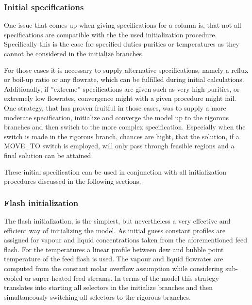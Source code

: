    \subsubsection{Initial specifications}
        One issue that comes up when giving specifications for a column is, that not all specifications
        are compatible with the the used initialization procedure. Specifically this is the case for
        specified duties purities or temperatures as they cannot be considered in the initialize branches.

        For those cases it is necessary to supply alternative specifications, namely a reflux or boil-up ratio
        or any flowrate, which can be fulfilled during initial calculations. Additionally, if ''extreme''
        specifications are given such as very high purities, or extremely low flowrates, convergence might
        with a given procedure might fail. One strategy, that has proven fruitful in those cases, was to
        supply a more moderate specification, initialize and converge the model up to the rigorous
        branches and then switch to the more complex specification. Especially when the switch is made in the
        rigorous branch, chances are hight, that the solution, if a MOVE\_TO switch is employed, will only
        pass through feasible regions and a final solution can be attained.

        These initial specification can be used in conjunction with all initialization procedures discussed
        in the following sections.

    \subsubsection{Flash initialization}
        The flash initialization, is the simplest, but nevertheless a very effective and efficient way
        of initializing the model. As initial guess constant profiles are assigned for vapour and liquid
        concentrations taken from the aforementioned feed flash. For the temperatures a linear profile
        between dew and bubble point temperature of the feed flash is used. The vapour and liquid
        flowrates are computed from the constant molar overflow assumption while considering
        sub-cooled or super-heated feed streams. In terms of the model this strategy translates into
        starting all selectors in the initialize branches and then simultaneously switching all selectors
        to the rigorous branches.

